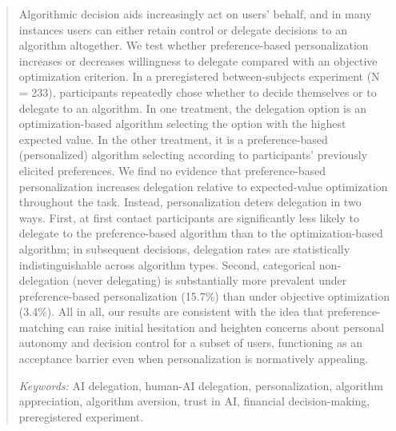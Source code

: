 \documentclass[a4paper, 12pt, fleqn]{article}
\theoremstyle{definition}
\begin{document}
\begin{abstract}
  Algorithmic decision aids increasingly act on users’ behalf, and in many instances users can either retain control or delegate decisions to an algorithm altogether. We test whether preference-based personalization increases or decreases willingness to delegate compared with an objective optimization criterion. In a preregistered between-subjects experiment (N = 233), participants repeatedly chose whether to decide themselves or to delegate to an algorithm. In one treatment, the delegation option is an optimization-based algorithm selecting the option with the highest expected value. In the other treatment, it is a preference-based (personalized) algorithm selecting according to participants’ previously elicited preferences. We find no evidence that preference-based personalization increases delegation relative to expected-value optimization throughout the task. Instead, personalization deters delegation in two ways. First, at first contact participants are significantly less likely to delegate to the preference-based algorithm than to the optimization-based algorithm; %
  in subsequent decisions, delegation rates are statistically indistinguishable across algorithm types. Second, categorical non-delegation (never delegating) is substantially more prevalent under preference-based personalization (15.7\%) than under objective optimization (3.4\%). 
  All in all, our results are consistent with the idea that preference-matching can raise initial hesitation and heighten concerns about personal autonomy and decision control for a subset of users, functioning as an acceptance barrier even when personalization is normatively appealing.
  
     \vspace{.25cm}
  \textit{Keywords:} {AI delegation, human-AI delegation, personalization, algorithm appreciation, algorithm aversion, trust in AI, financial decision-making, preregistered experiment.}\vspace{.15cm}
\end{abstract}
\vspace{-.5cm}
\end{document}
